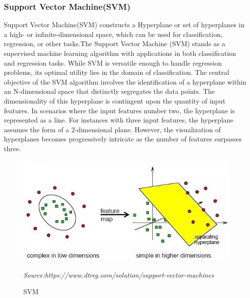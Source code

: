 \subsubsection{Support Vector Machine(SVM)}
Support Vector Machine(SVM) constructs a Hyperplane or set of hyperplanes in a high- or infinite-dimensional space, which can be used for classification, regression, or other tasks.The Support Vector Machine (SVM) stands as a supervised machine learning algorithm with applications in both
classification and regression tasks. While SVM is versatile enough to handle regression problems, its optimal
utility lies in the domain of classification. The central objective of the SVM algorithm involves the identification
of a hyperplane within an N-dimensional space that distinctly segregates the data points. The dimensionality of
this hyperplane is contingent upon the quantity of input features. In scenarios where the input features number
two, the hyperplane is represented as a line. For instances with three input features, the hyperplane assumes the
form of a 2-dimensional plane. However, the visualization of hyperplanes becomes progressively intricate as the
number of features surpasses three\cite{pralhad}.

\begin{figure}[h]
\centering
\includegraphics[scale=0.65]{svm.png}
\caption{SVM}
\textit{Source:https://www.dtreg.com/solution/support-vector-machines}
\end{figure}


